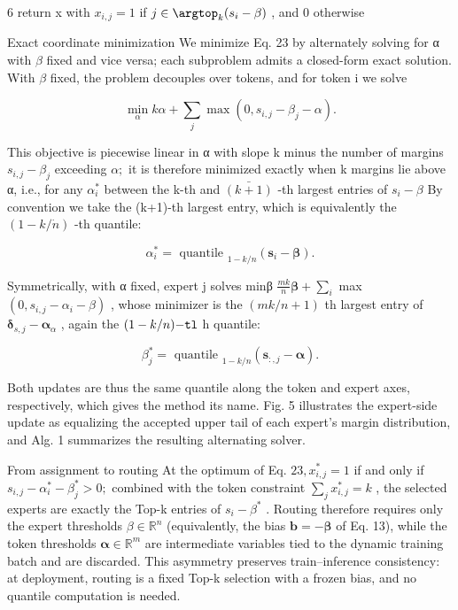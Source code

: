 \documentclass[
  10
]{article}
\begin{document}
6 return x with \(x_{i,j} = 1\) if \(j \in \argtop_k(s_i - \beta)\) ,
and 0 otherwise

Exact coordinate minimization We minimize Eq. 23 by alternately solving
for α with \(\beta\) fixed and vice versa; each subproblem admits a
closed-form exact solution. With \(\beta\) fixed, the problem decouples
over tokens, and for token i we solve

\[
\min _ {\alpha} k \alpha + \sum_ {j} \max \left(0, s _ {i, j} - \beta_ {j} - \alpha\right).\tag{24}
\]

This objective is piecewise linear in α with slope k minus the number of
margins \(s _ { i , j } - \beta _ { j }\) exceeding \(\alpha ;\) it is
therefore minimized exactly when k margins lie above α, i.e., for any
\(\alpha _ { i } ^ { * }\) between the k-th and
\(\bar { ( k { + } 1 ) }\) -th largest entries of \(s _ { i } - \beta\)
By convention we take the (k+1)-th largest entry, which is equivalently
the \(( 1 - k / \dot { n } )\) -th quantile:

\[
\alpha_ {i} ^ {*} = \text { quantile } _ {1 - k / n} (\boldsymbol {s} _ {i} - \boldsymbol {\beta}).\tag{25}
\]

Symmetrically, with α fixed, expert j solves minβ
\({ \frac { m k } { n } } { \boldsymbol { \beta } } + \sum _ { i }\) max
\(( 0 , s _ { i , j } - \alpha _ { i } - \beta )\) , whose minimizer is
the \(( m k / n { + } 1 )\) th largest entry of
\(\mathbf { \delta } _ { s , j } - \mathbf { \alpha } _ { \alpha }\) ,
again the \(( 1 - k / n ) { \tt - t l }\) h quantile:

\[
\beta_ {j} ^ {*} = \text { quantile } _ {1 - k / n} \left(\boldsymbol {s} _ {:, j} - \boldsymbol {\alpha}\right).\tag{26}
\]

Both updates are thus the same quantile along the token and expert axes,
respectively, which gives the method its name. Fig. 5 illustrates the
expert-side update as equalizing the accepted upper tail of each
expert's margin distribution, and Alg. 1 summarizes the resulting
alternating solver.

From assignment to routing At the optimum of Eq.
\(2 3 , x _ { i , j } ^ { * } = 1\) if and only if
\(s _ { i , j } - \alpha _ { i } ^ { * } - \beta _ { j } ^ { * } > 0 ;\)
combined with the token constraint
\(\textstyle \sum _ { j } x _ { i , j } ^ { * } = k\) , the selected
experts are exactly the Top-k entries of \(s _ { i } - \beta ^ { * }\) .
Routing therefore requires only the expert thresholds
\(\beta \in \mathbb { R } ^ { n }\) (equivalently, the bias
\(\boldsymbol { b } = - \boldsymbol { \beta }\) of Eq. 13), while the
token thresholds \(\pmb { \alpha } \in \mathbb { R } ^ { m }\) are
intermediate variables tied to the dynamic training batch and are
discarded. This asymmetry preserves train--inference consistency: at
deployment, routing is a fixed Top-k selection with a frozen bias, and
no quantile computation is needed.
\end{document}
